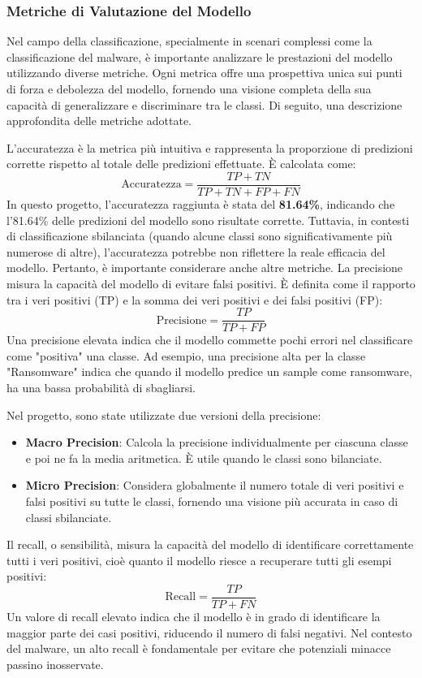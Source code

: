 \newpage
\subsubsection{Metriche di Valutazione del Modello}
Nel campo della classificazione, specialmente in scenari complessi come la classificazione del malware, è importante analizzare le prestazioni del modello utilizzando diverse metriche. Ogni metrica offre una prospettiva unica sui punti di forza e debolezza del modello, fornendo una visione completa della sua capacità di generalizzare e discriminare tra le classi. Di seguito, una descrizione approfondita delle metriche adottate.

L'accuratezza è la metrica più intuitiva e rappresenta la proporzione di predizioni corrette rispetto al totale delle predizioni effettuate. È calcolata come:
\[
\text{Accuratezza} = \frac{TP + TN}{TP + TN + FP + FN}
\]
In questo progetto, l'accuratezza raggiunta è stata del \textbf{81.64\%}, indicando che l'81.64\% delle predizioni del modello sono risultate corrette. Tuttavia, in contesti di classificazione sbilanciata (quando alcune classi sono significativamente più numerose di altre), l'accuratezza potrebbe non riflettere la reale efficacia del modello. Pertanto, è importante considerare anche altre metriche.
La precisione misura la capacità del modello di evitare falsi positivi. È definita come il rapporto tra i veri positivi (TP) e la somma dei veri positivi e dei falsi positivi (FP):
\[
\text{Precisione} = \frac{TP}{TP + FP}
\]
Una precisione elevata indica che il modello commette pochi errori nel classificare come "positiva" una classe. Ad esempio, una precisione alta per la classe "Ransomware" indica che quando il modello predice un sample come ransomware, ha una bassa probabilità di sbagliarsi.

Nel progetto, sono state utilizzate due versioni della precisione:
\begin{itemize}
    \item \textbf{Macro Precision}: Calcola la precisione individualmente per ciascuna classe e poi ne fa la media aritmetica. È utile quando le classi sono bilanciate.
    \item \textbf{Micro Precision}: Considera globalmente il numero totale di veri positivi e falsi positivi su tutte le classi, fornendo una visione più accurata in caso di classi sbilanciate.
\end{itemize}

Il recall, o sensibilità, misura la capacità del modello di identificare correttamente tutti i veri positivi, cioè quanto il modello riesce a recuperare tutti gli esempi positivi:
\[
\text{Recall} = \frac{TP}{TP + FN}
\]
Un valore di recall elevato indica che il modello è in grado di identificare la maggior parte dei casi positivi, riducendo il numero di falsi negativi. Nel contesto del malware, un alto recall è fondamentale per evitare che potenziali minacce passino inosservate.

